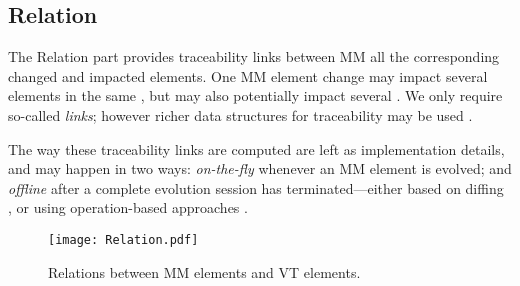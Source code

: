 \subsection{Relation}
\label{sec:Suggestion:Relation}

The \textsf{Relation} part provides traceability links between \textsf{MM}
all the corresponding \textsf{changed} and \textsf{impacted} elements.
One \textsf{MM} element change
may impact several elements in the same \viewtype, but may also potentially
impact several \viewtypes. We only require so-called \emph{links}; however richer
data structures for traceability may be used \cite{Batot-Cabot-Gerard:2021}.

The way these traceability links are computed are left as implementation
details, and may happen in two ways: \emph{on-the-fly} whenever an \textsf{MM} element is evolved; and \emph{offline}
after a complete evolution session has terminated---either based on diffing \cite{Kehrer-Kelter-Taentzer:2011}, or using 
operation-based approaches \cite{J:Lippe-Oosterom:1992}.

\begin{figure}[t]
    \centering
    \texttt{[image: Relation.pdf]}
    \caption{\textsf{Relation}s between \textsf{MM} elements and \textsf{VT} elements.}
    \label{fig:Relation}
\end{figure}

